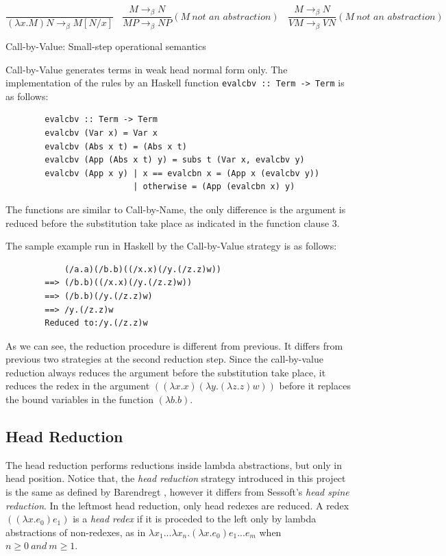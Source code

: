 \documentclass[a4paper,11pt,twoside]{report}
\begin{document}
\begin{equation*}
\frac{}{(\lambda x.M)N \rightarrow _\beta M[N/x]}\ \ \ \  
\frac{M \rightarrow _\beta N}{MP \rightarrow _\beta NP}(M\ \textit{not an abstraction})\ \ \ \
\frac{M \rightarrow _\beta N}{VM \rightarrow _\beta VN}(M\ \textit{not an abstraction})\ \ \ 
\end{equation*}
\begin{center}
Call-by-Value: Small-step operational semantics
\end{center}

Call-by-Value generates terms in weak head normal form only. The implementation of the rules by an Haskell function \verb|evalcbv :: Term -> Term| is as follows:

\begin{verbatim}
        evalcbv :: Term -> Term
        evalcbv (Var x) = Var x
        evalcbv (Abs x t) = (Abs x t)
        evalcbv (App (Abs x t) y) = subs t (Var x, evalcbv y)
        evalcbv (App x y) | x == evalcbn x = (App x (evalcbv y))
                          | otherwise = (App (evalcbn x) y)  
\end{verbatim}

The functions are similar to Call-by-Name, the only difference is the argument is reduced before the substitution take place as indicated in the function clause 3.

The sample example run in Haskell by the Call-by-Value strategy is as follows:

\begin{verbatim}
            (/a.a)(/b.b)((/x.x)(/y.(/z.z)w))
        ==> (/b.b)((/x.x)(/y.(/z.z)w))
        ==> (/b.b)(/y.(/z.z)w)
        ==> /y.(/z.z)w
        Reduced to:/y.(/z.z)w
\end{verbatim}

As we can see, the reduction procedure is different from previous. It differs from previous two strategies at the second reduction step. Since the call-by-value reduction always reduces the argument before the substitution take place, it reduces the redex in the argument $((\lambda x.x)(\lambda y.(\lambda z.z)w))$ before it replaces the bound variables in the function $(\lambda b.b)$.    


\subsection{Head Reduction}

The head reduction performs reductions inside lambda abstractions, but only in head position. Notice that, the \textit{head reduction} strategy introduced in this project is the same as defined by Barendregt \cite{barendregt1984lambda}, however it differs from Sessoft's \cite{sestoft2002demonstrating} \textit{head spine reduction}. In the leftmost head reduction, only head redexes are reduced. A redex $((\lambda x.e_0)e_1)$ is a \textit{head redex} if it is proceded to the left only by lambda abstractions of non-redexes, as in $\lambda x_1...\lambda x_n.(\lambda x.e_0)e_1...e_m$ when $n \geqslant 0\ and\ m \geqslant 1$.
\end{document}
